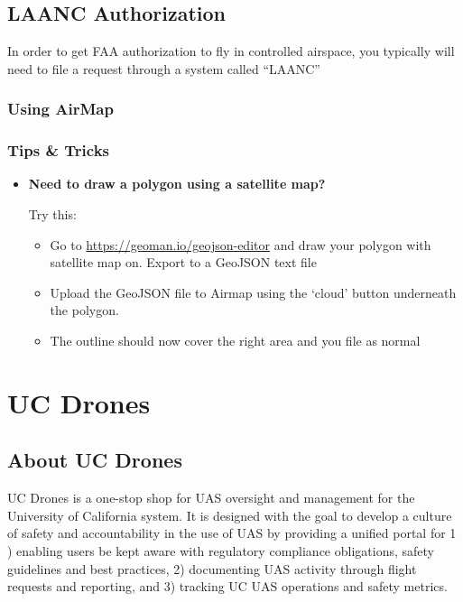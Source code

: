 \documentclass[
]{book}
\providecommand{\tightlist}{%
  \setlength{\itemsep}{0pt}\setlength{\parskip}{0pt}}
\begin{document}
\hypertarget{ch-LAANC}{%
\chapter{LAANC Authorization}\label{ch-LAANC}}

In order to get FAA authorization to fly in controlled airspace, you typically will need to file a request through a system called ``LAANC''

\hypertarget{using-airmap}{%
\section{Using AirMap}\label{using-airmap}}

\hypertarget{tips-tricks}{%
\section{Tips \& Tricks}\label{tips-tricks}}

\begin{itemize}
\item
  \textbf{Need to draw a polygon using a satellite map?}

  Try this:

  \begin{itemize}
  \tightlist
  \item
    Go to \url{https://geoman.io/geojson-editor} and draw your polygon with satellite map on. Export to a GeoJSON text file
  \item
    Upload the GeoJSON file to Airmap using the `cloud' button underneath the polygon.
  \item
    The outline should now cover the right area and you file as normal
  \end{itemize}
\end{itemize}

\hypertarget{part-uc-drones}{%
\part{UC Drones}\label{part-uc-drones}}

\hypertarget{ch-about-UCdrones}{%
\chapter{About UC Drones}\label{ch-about-UCdrones}}

UC Drones is a one-stop shop for UAS oversight and management for the University of California system. It is designed with the goal to develop a culture of safety and accountability in the use of UAS by providing a unified portal for 1 ) enabling users be kept aware with regulatory compliance obligations, safety guidelines and best practices, 2) documenting UAS activity through flight requests and reporting, and 3) tracking UC UAS operations and safety metrics.
\end{document}
